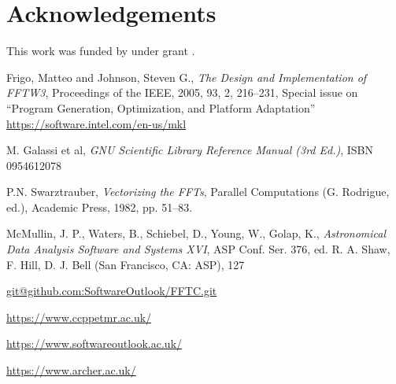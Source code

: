 \documentclass[12pt, a4paper]{article}
\begin{document}
\section{Acknowledgements}
This work was funded by under grant .
\begin{thebibliography}{9}

Frigo, Matteo and Johnson, Steven G.,
{\it The Design and Implementation of FFTW3},
Proceedings of the IEEE,
2005,
93,
2,
216--231,
Special issue on ``Program Generation, Optimization, and Platform Adaptation''
\hyperlink{https://software.intel.com/en-us/mkl}{https://software.intel.com/en-us/mkl}

M. Galassi et al, {\it GNU Scientific Library Reference Manual (3rd Ed.)}, ISBN 0954612078
  
P.N. Swarztrauber, {\it Vectorizing the FFTs}, Parallel Computations (G. Rodrigue, ed.), Academic Press, 1982, pp. 51--83.
  
McMullin, J. P., Waters, B., Schiebel, D., Young, W., Golap, K.,
{\it Astronomical Data Analysis Software and Systems XVI},
ASP Conf. Ser. 376, ed. R. A. Shaw, F. Hill, D. J. Bell (San Francisco, CA: ASP), 127

\hyperlink{git@github.com:SoftwareOutlook/FFTC.git}{git@github.com:SoftwareOutlook/FFTC.git}
    
\hyperlink{https://www.ccppetmr.ac.uk/}{https://www.ccppetmr.ac.uk/}

\hyperlink{https://www.softwareoutlook.ac.uk/}{https://www.softwareoutlook.ac.uk/}

\hyperlink{https://www.archer.ac.uk/}{https://www.archer.ac.uk/}
  
\end{thebibliography}
\end{document}
